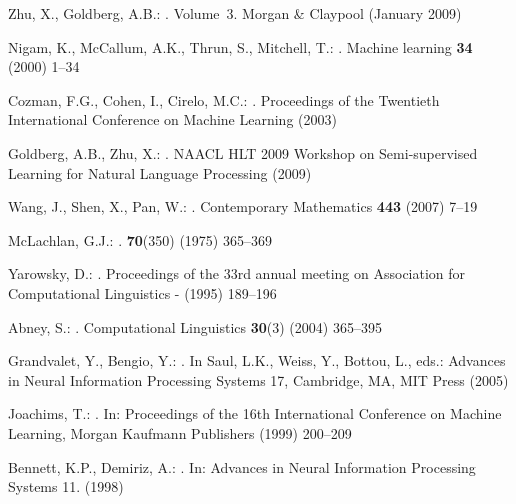 \documentclass[smallcondensed]{svjour3}
\begin{document}
\begin{thebibliography}{10}
Zhu, X., Goldberg, A.B.:
. Volume~3.
\newblock Morgan \& Claypool (January 2009)

Nigam, K., McCallum, A.K., Thrun, S., Mitchell, T.:
.
\newblock Machine learning \textbf{34} (2000)  1--34

Cozman, F.G., Cohen, I., Cirelo, M.C.:
.
\newblock Proceedings of the Twentieth International Conference on Machine
  Learning (2003)

Goldberg, A.B., Zhu, X.:
.
\newblock NAACL HLT 2009 Workshop on Semi-supervised Learning for Natural
  Language Processing (2009)

Wang, J., Shen, X., Pan, W.:
.
\newblock Contemporary Mathematics \textbf{443} (2007)  7--19

McLachlan, G.J.:
.
\newblock \textbf{70}(350) (1975)  365--369

Yarowsky, D.:
.
\newblock Proceedings of the 33rd annual meeting on Association for
  Computational Linguistics - (1995)  189--196

Abney, S.:
.
\newblock Computational Linguistics \textbf{30}(3) (2004)  365--395

Grandvalet, Y., Bengio, Y.:
.
\newblock In Saul, L.K., Weiss, Y., Bottou, L., eds.: Advances in Neural
  Information Processing Systems 17, Cambridge, MA, MIT Press (2005)

Joachims, T.:
.
\newblock In: Proceedings of the 16th International Conference on Machine
  Learning, Morgan Kaufmann Publishers (1999)  200--209

Bennett, K.P., Demiriz, A.:
.
\newblock In: Advances in Neural Information Processing Systems 11. (1998)


\end{thebibliography}
\end{document}
